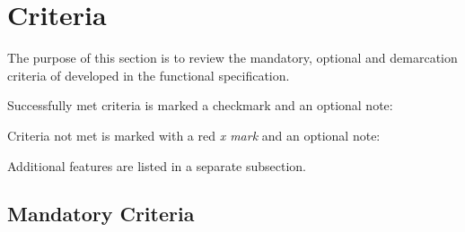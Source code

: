 \section{Criteria}

The purpose of this section is to review the mandatory, optional and demarcation criteria of \mamid developed
in the functional specification.

Successfully met criteria is marked a checkmark and an optional note:\\

Criteria not met is marked with a red \textit{x mark} and an optional note:\\

Additional features are listed in a separate subsection.

\subsection{Mandatory Criteria}

